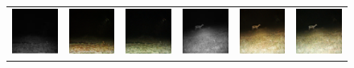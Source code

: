 \begin{figure}[htp!]
\begin{tabularx}{\textwidth}{Y Y Y !{\space} Y Y Y}
        \includegraphics{gfx/conditional-with-cycle-gan-qual/nir_S2_B06_R3_PICT3848.jpg} & \includegraphics{gfx/conditional-with-cycle-gan-qual/cyclegan_S2_B06_R3_PICT3848_fake.png} & \includegraphics{gfx/conditional-with-cycle-gan-qual/diff_cycle_gan_S2_B06_R3_PICT3848_fake.png} & \includegraphics{gfx/conditional-with-cycle-gan-qual/nir_S2_B07_R1_PICT3274.jpg} & \includegraphics{gfx/conditional-with-cycle-gan-qual/cyclegan_S2_B07_R1_PICT3274_fake.png} & \includegraphics{gfx/conditional-with-cycle-gan-qual/diff_cycle_gan_S2_B07_R1_PICT3274_fake.png}
    \end{tabularx}
    \caption{
    }
    \label{fig:qualitative-evaluation-cyclegan-conditional-sampling}
\end{figure}

